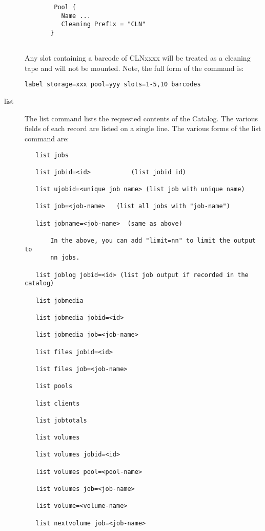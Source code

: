 \begin{description}
\footnotesize
\begin{verbatim}
        Pool {
          Name ...
          Cleaning Prefix = "CLN"
       }
        
\end{verbatim}
\normalsize

Any slot containing a barcode of CLNxxxx will be treated as a cleaning tape
and will not be mounted.  Note, the full form of the command is:

\footnotesize
\begin{verbatim}
label storage=xxx pool=yyy slots=1-5,10 barcodes
\end{verbatim}
\normalsize

\item [list]
   The list command lists the requested contents of the Catalog.  The
   various fields of each record are listed on a single line.  The various
   forms of the list command are:
\footnotesize
\begin{verbatim}
   list jobs
   
   list jobid=<id>           (list jobid id)

   list ujobid=<unique job name> (list job with unique name)
   
   list job=<job-name>   (list all jobs with "job-name")

   list jobname=<job-name>  (same as above)

       In the above, you can add "limit=nn" to limit the output to
       nn jobs.
   
   list joblog jobid=<id> (list job output if recorded in the catalog)

   list jobmedia
   
   list jobmedia jobid=<id>
   
   list jobmedia job=<job-name>
   
   list files jobid=<id>
   
   list files job=<job-name>
   
   list pools
   
   list clients
   
   list jobtotals
   
   list volumes
   
   list volumes jobid=<id>
   
   list volumes pool=<pool-name>
   
   list volumes job=<job-name>
   
   list volume=<volume-name>  

   list nextvolume job=<job-name>
   

\end{verbatim}
\end{description}

